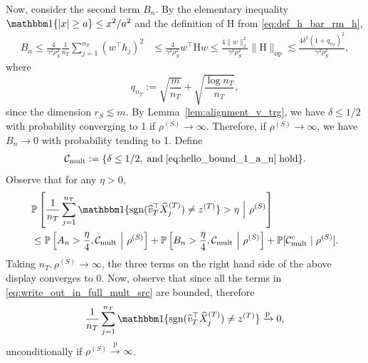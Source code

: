 \documentclass[10pt]{article}
\newcommand{\Pbb}{\mathbb P}
\newcommand{\op}{\mathrm{op}}
\newcommand{\sgn}{\operatorname{sgn}}
\newcommand{\convp}{\xrightarrow{\mathrm{p}}}
\newcommand{\wh}{\widehat}
\newcommand{\trg}{T}
\newcommand{\nT}{n_{\trg}}
\newcommand{\ztar}{z^{(\trg)}}
\newcommand{\src}{S}
\begin{document}
Now, consider the second term $B_n$. By the elementary inequality $\mathbbm 1\{|x|\ge a\}\le x^2/a^2$ and the definition of $\mathrm H$ from \eqref{eq:def_h_bar_rm_h},
\begin{align}
B_n\le\frac4{\gamma^2\rho^2_\src}\frac{1}{\nT}\sum_{j =1}^{\nT}(w^\top h_j)^2& \le \frac{4}{\gamma^2\rho^2_\src}w^\top \mathrm Hw \le\frac{4\|w\|_2^2}{\gamma^2\rho^2_\src}\|\mathrm H\|_{\op}\lesssim\frac{4\delta^2(1+q_{\nT})^2}{\gamma^2\rho^2_\src},
\label{eq:dependent_bound}
\end{align}
where 
\[
q_{\nT}:=\sqrt{\frac{m}{\nT}}+\sqrt{\frac{\log\nT}{\nT}},
\]
since the dimension $r_{\src} \lesssim m$.
By Lemma~\ref{lem:alignment_v_trg}, we have $\delta \le 1/2$ with probability converging to 1 if $\rho^{(\src)} \to \infty$. Therefore, if $\rho^{(\src)} \to \infty$, we have $B_n \to 0$ with probability tending to 1. Define
\begin{align}
    \mathcal C_{\mathrm{mult}}:=\{\delta \le 1/2,\;\mbox{and}\;\eqref{eq:hello_bound_1_a_n}\; \mbox{hold}\}.
\end{align}
Observe that for any $\eta>0$, 
\begin{align}
\label{eq:write_out_in_full_mult_src}
    &\Pbb\left[\frac{1}{\nT}\sum_{j =1}^{\nT}\mathbbm 1\{\sgn(\wh v^\top_\trg\wh{X}^{(\trg)}_j) \neq \ztar\} > \eta ~\Big|~ \rho^{(\src)}\right] \\
    & \le \Pbb\left[A_n > \frac{\eta}{4},\mathcal C_{\mathrm{mult}}~\Big|~ \rho^{(\src)}\right]+\Pbb\left[B_n > \frac{\eta}{4},\mathcal C_{\mathrm{mult}}~\Big|~ \rho^{(\src)}\right]+\Pbb[\mathcal C^c_{\mathrm{mult}} \mid \rho^{(\src)}].
\end{align}
Taking $\nT, \rho^{(\src)} \to \infty$, the three terms on the right hand side of the above display converges to 0. Now, observe that since all the terms in \eqref{eq:write_out_in_full_mult_src} are bounded, therefore 
\begin{align}
\label{eq:consistency_mult_source_spectral}
\frac{1}{\nT}\sum_{j =1}^{\nT}\mathbbm 1\{\sgn(\wh v^\top_\trg\wh{X}^{(\trg)}_j) \neq \ztar\} \convp 0,
\end{align}
unconditionally if $\rho^{(\src)} \convp \infty$. 
\end{document}
